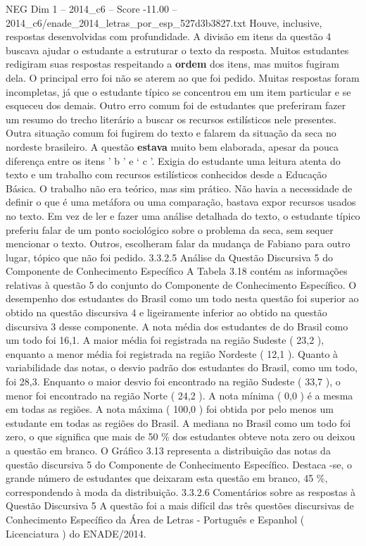 \begin{textsample}{NEG Dim 1 – 2014\_c6 – Score -11.00 – 2014\_c6/enade\_2014\_letras\_por\_esp\_527d3b3827.txt}
Houve, inclusive, respostas desenvolvidas com profundidade.
A divisão em itens da questão 4 buscava ajudar o estudante a estruturar o texto da resposta.
Muitos estudantes redigiram suas respostas respeitando a \textbf{ordem} dos itens, mas muitos fugiram dela.
O principal erro foi não se aterem ao que foi pedido.
Muitas respostas foram incompletas, já que o estudante típico se concentrou em um item particular e se esqueceu dos demais.
Outro erro comum foi de estudantes que preferiram fazer um resumo do trecho literário a buscar os recursos estilísticos nele presentes.
Outra situação comum foi fugirem do texto e falarem da situação da seca no nordeste brasileiro.
A questão \textbf{estava} muito bem elaborada, apesar da pouca diferença entre os itens ’ b ’ e ‘ c ’.
Exigia do estudante uma leitura atenta do texto e um trabalho com recursos estilísticos conhecidos desde a Educação Básica.
O trabalho não era teórico, mas sim prático.
Não havia a necessidade de definir o que é uma metáfora ou uma comparação, bastava expor recursos usados no texto.
Em vez de ler e fazer uma análise detalhada do texto, o estudante típico preferiu falar de um ponto sociológico sobre o problema da seca, sem sequer mencionar o texto.
Outros, escolheram falar da mudança de Fabiano para outro lugar, tópico que não foi pedido. 3.3.2.5 Análise da Questão Discursiva 5 do Componente de Conhecimento Específico A Tabela 3.18 contém as informações relativas à questão 5 do conjunto do Componente de Conhecimento Específico.
O desempenho dos estudantes do Brasil como um todo nesta questão foi superior ao obtido na questão discursiva 4 e ligeiramente inferior ao obtido na questão discursiva 3 desse componente.
A nota média dos estudantes de do Brasil como um todo foi 16,1.
A maior média foi registrada na região Sudeste ( 23,2 ), enquanto a menor média foi registrada na região Nordeste ( 12,1 ).
Quanto à variabilidade das notas, o desvio padrão dos estudantes do Brasil, como um todo, foi 28,3.
Enquanto o maior desvio foi encontrado na região Sudeste ( 33,7 ), o menor foi encontrado na região Norte ( 24,2 ).
A nota mínima ( 0,0 ) é a mesma em todas as regiões.
A nota máxima ( 100,0 ) foi obtida por pelo menos um estudante em todas as regiões do Brasil.
A mediana no Brasil como um todo foi zero, o que significa que mais de 50 \% dos estudantes obteve nota zero ou deixou a questão em branco.
O Gráfico 3.13 representa a distribuição das notas da questão discursiva 5 do Componente de Conhecimento Específico.
Destaca -se, o grande número de estudantes que deixaram esta questão em branco, 45 \%, correspondendo à moda da distribuição. 3.3.2.6 Comentários sobre as respostas à Questão Discursiva 5 A questão foi a mais difícil das três questões discursivas de Conhecimento Específico da Área de Letras - Português e Espanhol ( Licenciatura ) do ENADE/2014.

\end{textsample}
